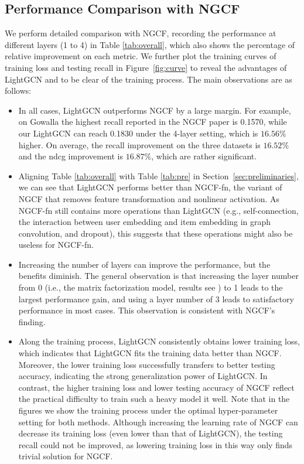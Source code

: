 \subsection{Performance Comparison with NGCF}\label{ss:exp-ngcf}
We perform detailed comparison with NGCF, recording the performance at different layers (1 to 4) in Table \ref{tab:overall}, which also shows the percentage of relative improvement on each metric. 
We further plot the training curves of training loss and testing recall in Figure~\ref{fig:curve} to reveal the advantages of LightGCN and to be clear of the training process. 
The main observations are as follows:
\begin{itemize}[leftmargin=*]
    \item In all cases, LightGCN outperforms NGCF by a large margin. For example, on Gowalla the highest recall reported in the NGCF paper is 0.1570, while our LightGCN can reach 0.1830 under the 4-layer setting, which is $16.56\%$ higher. On average, the recall improvement on the three datasets is $16.52\%$ and the ndcg improvement is $16.87\%$, which are rather significant.
    \item Aligning Table \ref{tab:overall} with Table \ref{tab:pre} in Section~\ref{sec:preliminaries}, we can see that LightGCN performs better than NGCF-fn, the variant of NGCF that removes feature transformation and nonlinear activation. As NGCF-fn still contains more operations than LightGCN (e.g., self-connection, the interaction between user embedding and item embedding in graph convolution, and dropout), this suggests that these operations might also be useless for NGCF-fn. 
    \item Increasing the number of layers can improve the performance, but the benefits diminish. The general observation is that increasing the layer number from 0 (i.e., the matrix factorization model, results see \cite{NGCF}) to 1 leads to the largest performance gain, and using a layer number of 3 leads to satisfactory performance in most cases. This observation is consistent with NGCF's finding.
    \item Along the training process, LightGCN consistently obtains lower training loss, which indicates that LightGCN fits the training data better than NGCF. Moreover, the lower training loss successfully transfers to better testing accuracy, indicating the strong generalization power of LightGCN. In contrast, the higher training loss and lower testing accuracy of NGCF reflect the practical difficulty to train such a heavy model it well. Note that in the figures we show the training process under the optimal hyper-parameter setting for both methods. Although increasing the learning rate of NGCF can decrease its training loss (even lower than that of LightGCN), the testing recall could not be improved, as lowering training loss in this way only finds trivial solution for NGCF. 
\end{itemize}

